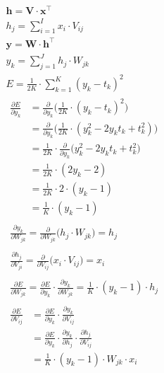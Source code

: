 \documentclass{article}
\begin{document}
\addtolength{\jot}{1em}
\begin{align}
	&\boldsymbol{h} = \boldsymbol{V} \cdot \boldsymbol{x}^\top \\
	&h_j = \sum_{i=1}^I x_i \cdot V_{ij} \\
	&\boldsymbol{y} = \boldsymbol{W} \cdot \boldsymbol{h}^\top \\
	&y_k = \sum_{j=1}^J h_j \cdot W_{jk} \\
	&E = \frac{1}{2K} \cdot \sum_{k=1}^K (y_k - t_k)^2 \\
	&\begin{aligned}
		\frac{\partial E}{\partial y_k} &= \frac{\partial}{\partial y_k} \Big(\frac{1}{2K} \cdot (y_k - t_k)^2\Big) \\
		&= \frac{\partial}{\partial y_k} \Big(\frac{1}{2K} \cdot (y_k^2 - 2y_kt_k + t_k^2)\Big) \\
		&= \frac{1}{2K} \cdot \frac{\partial}{\partial y_k} \Big(y_k^2 - 2y_kt_k + t_k^2\Big) \\
		&= \frac{1}{2K} \cdot (2y_k - 2) \\
		&= \frac{1}{2K} \cdot 2 \cdot (y_k - 1) \\
		&= \frac{1}{K} \cdot (y_k - 1)
	\end{aligned} \\
	&\begin{aligned}
		\frac{\partial y_k}{\partial W_{jk}} = \frac{\partial}{\partial W_{jk}} \Big(h_j \cdot W_{jk}\Big) = h_j
	\end{aligned} \\
	&\begin{aligned}
		\frac{\partial h_j}{\partial V_{ji}} = \frac{\partial}{\partial V_{ij}} \Big(x_i \cdot V_{ij}\Big) = x_i
	\end{aligned} \\
	&\begin{aligned}
		\frac{\partial E}{\partial W_{jk}} = \frac{\partial E}{\partial y_k} \cdot \frac{\partial y_k}{\partial W_{jk}} = \frac{1}{K} \cdot (y_k - 1) \cdot h_j
	\end{aligned} \\
	&\begin{aligned}
		\frac{\partial E}{\partial V_{ij}} &= \frac{\partial E}{\partial y_k} \cdot \frac{\partial y_k}{\partial V_{ij}} \\
		&= \frac{\partial E}{\partial y_k} \cdot \frac{\partial y_k}{\partial h_j} \cdot \frac{\partial h_j}{\partial V_{ij}} \\
		&= \frac{1}{K} \cdot (y_k - 1) \cdot W_{jk} \cdot x_i
	\end{aligned}
\end{align}
\end{document}
